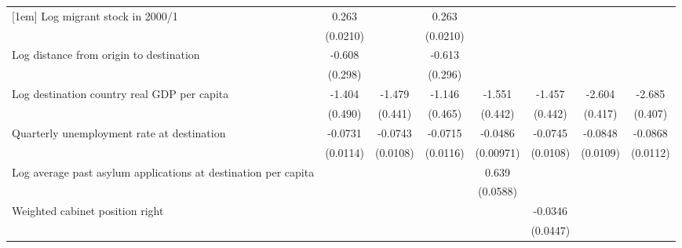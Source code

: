 \begin{table}[htbp]
\begin{tabular}{l*{7}{c}}
[1em]
Log migrant stock in 2000/1&       0.263\sym{***}&                     &       0.263\sym{***}&                     &                     &                     &                     \\
                    &    (0.0210)         &                     &    (0.0210)         &                     &                     &                     &                     \\
[1em]
Log distance from origin to destination&      -0.608\sym{*}  &                     &      -0.613\sym{*}  &                     &                     &                     &                     \\
                    &     (0.298)         &                     &     (0.296)         &                     &                     &                     &                     \\
[1em]
Log destination country real GDP per capita&      -1.404\sym{**} &      -1.479\sym{**} &      -1.146\sym{*}  &      -1.551\sym{***}&      -1.457\sym{**} &      -2.604\sym{***}&      -2.685\sym{***}\\
                    &     (0.490)         &     (0.441)         &     (0.465)         &     (0.442)         &     (0.442)         &     (0.417)         &     (0.407)         \\
[1em]
Quarterly unemployment rate at destination&     -0.0731\sym{***}&     -0.0743\sym{***}&     -0.0715\sym{***}&     -0.0486\sym{***}&     -0.0745\sym{***}&     -0.0848\sym{***}&     -0.0868\sym{***}\\
                    &    (0.0114)         &    (0.0108)         &    (0.0116)         &   (0.00971)         &    (0.0108)         &    (0.0109)         &    (0.0112)         \\
[1em]
Log average past asylum applications at destination per capita&                     &                     &                     &       0.639\sym{***}&                     &                     &                     \\
                    &                     &                     &                     &    (0.0588)         &                     &                     &                     \\
[1em]
Weighted cabinet position right&                     &                     &                     &                     &     -0.0346         &                     &                     \\
                    &                     &                     &                     &                     &    (0.0447)         &                     &                     \\

\end{tabular}
\end{table}
